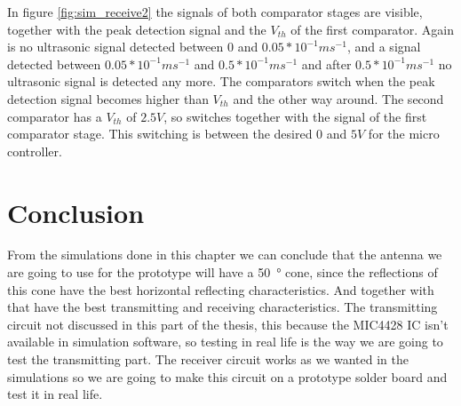 In figure \ref{fig:sim_receive2} the signals of both comparator stages are visible, together with the peak detection signal and the $V_{th}$ of the first comparator. Again is no ultrasonic signal detected between 0 and $0.05*10^{-1}ms^{-1}$, and a signal detected between $0.05*10^{-1}ms^{-1}$ and $0.5*10^{-1}ms^{-1}$ and after $0.5*10^{-1}ms^{-1}$ no ultrasonic signal is detected any more.
The comparators switch when the peak detection signal becomes higher than $V_{th}$ and the other way around. The second comparator has a $V_{th}$ of $2.5V$, so switches together with the signal of the first comparator stage. This switching is between the desired 0 and $5V$ for the micro controller.


\section{Conclusion}
From the simulations done in this chapter we can conclude that the antenna we are going to use for the prototype will have a \SI{50}{\degree} cone, since the reflections of this cone have the best horizontal reflecting characteristics. And together with that have the best transmitting and receiving characteristics.  The transmitting circuit not discussed in this part of the thesis, this because the MIC4428 \cite{MIC4428} IC isn't available in simulation software, so testing in real life is the way we are going to test the transmitting part. The receiver circuit works as we wanted in the simulations so we are going to make this circuit on a prototype solder board and test it in real life.
